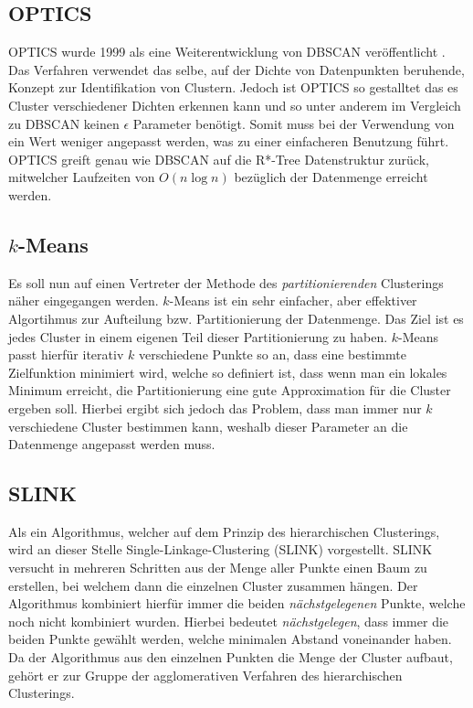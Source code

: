 \documentclass{lni}
\begin{document}

\subsection{OPTICS}
OPTICS wurde 1999 als eine Weiterentwicklung von DBSCAN veröffentlicht \cite{OPTICS}. Das Verfahren verwendet das selbe, auf der Dichte von Datenpunkten beruhende, Konzept zur Identifikation von Clustern. Jedoch ist OPTICS so gestalltet das es Cluster verschiedener Dichten erkennen kann und so unter anderem im Vergleich zu DBSCAN keinen $\epsilon$ Parameter benötigt. Somit muss bei der Verwendung von ein Wert weniger angepasst werden, was zu einer einfacheren Benutzung führt. OPTICS greift genau wie DBSCAN auf die R*-Tree Datenstruktur zurück, mitwelcher Laufzeiten von $O(n\log n)$ bezüglich der Datenmenge erreicht werden.


\subsection{$k$-Means}
Es soll nun auf einen Vertreter der Methode des \textit{partitionierenden} Clusterings näher eingegangen werden. $k$-Means \cite{TOP10} ist ein sehr einfacher, aber effektiver Algortihmus zur Aufteilung bzw. Partitionierung der Datenmenge. Das Ziel ist es jedes Cluster in einem eigenen Teil dieser Partitionierung zu haben. $k$-Means passt hierfür iterativ $k$ verschiedene Punkte so an, dass eine bestimmte Zielfunktion minimiert wird, welche so definiert ist, dass wenn man ein lokales Minimum erreicht, die Partitionierung eine gute Approximation für die Cluster ergeben soll. Hierbei ergibt sich jedoch das Problem, dass man immer nur $k$ verschiedene Cluster bestimmen kann, weshalb dieser Parameter an die Datenmenge angepasst werden muss.


\subsection{SLINK}
Als ein Algorithmus, welcher auf dem Prinzip des hierarchischen Clusterings, wird an dieser Stelle Single-Linkage-Clustering  (SLINK)\cite{HIER} vorgestellt. SLINK versucht in mehreren Schritten aus der Menge aller Punkte einen Baum zu erstellen, bei welchem dann die einzelnen Cluster zusammen hängen. Der Algorithmus kombiniert hierfür immer die beiden \textit{nächstgelegenen} Punkte, welche noch nicht kombiniert wurden. Hierbei bedeutet \textit{nächstgelegen}, dass immer die beiden Punkte gewählt werden, welche minimalen Abstand voneinander haben. Da der Algorithmus aus den einzelnen Punkten die Menge der Cluster aufbaut, gehört er zur Gruppe der agglomerativen Verfahren des hierarchischen Clusterings.
\end{document}
